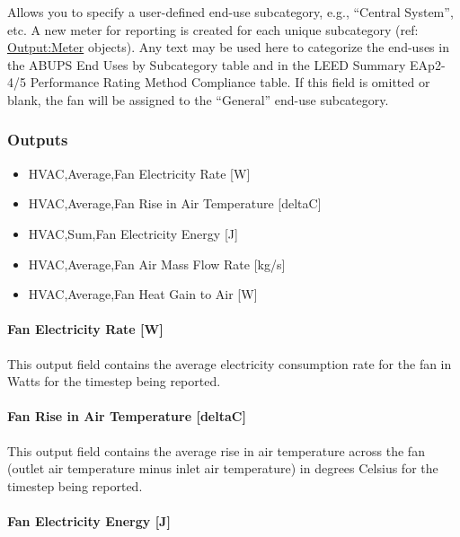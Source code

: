 Allows you to specify a user-defined end-use subcategory, e.g., ``Central System'', etc. A new meter for reporting is created for each unique subcategory (ref: \hyperref[outputmeter-and-outputmetermeterfileonly]{Output:Meter} objects). Any text may be used here to categorize the end-uses in the ABUPS End Uses by Subcategory table and in the LEED Summary EAp2-4/5 Performance Rating Method Compliance table. If this field is omitted or blank, the fan will be assigned to the ``General'' end-use subcategory.

\subsubsection{Outputs}\label{outputs-2-009}

\begin{itemize}
\item
  HVAC,Average,Fan Electricity Rate {[}W{]}
\item
  HVAC,Average,Fan Rise in Air Temperature {[}deltaC{]}
\item
  HVAC,Sum,Fan Electricity Energy {[}J{]}
\item
  HVAC,Average,Fan Air Mass Flow Rate {[}kg/s{]}
\item
  HVAC,Average,Fan Heat Gain to Air {[}W{]}
\end{itemize}

\paragraph{Fan Electricity Rate {[}W{]}}\label{fan-electric-power-w-2}

This output field contains the average electricity consumption rate for the fan in Watts for the timestep being reported.

\paragraph{Fan Rise in Air Temperature {[}deltaC{]}}\label{fan-rise-in-air-temperature-deltac-2}

This output field contains the average rise in air temperature across the fan (outlet air temperature minus inlet air temperature) in degrees Celsius for the timestep being reported.

\paragraph{Fan Electricity Energy {[}J{]}}\label{fan-electric-energy-j-2}

